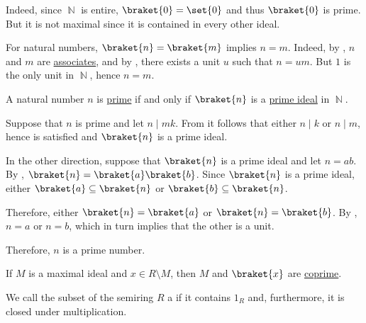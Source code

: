 \begin{example}
\begin{thmenum}
    Indeed, since \( \BbbN \) is entire, \( \braket{ 0 } = \set{ 0 } \) and thus \( \braket{ 0 } \) is prime. But it is not maximal since it is contained in every other ideal.

     For natural numbers, \( \braket{ n } = \braket{ m } \) implies \( n = m \). Indeed, by , \( n \) and \( m \) are \hyperref[def:divisibility/associates]{associates}, and by , there exists a unit \( u \) such that \( n = um \). But \( 1 \) is the only unit in \( \BbbN \), hence \( n = m \).

     A natural number \( n \) is \hyperref[def:prime_number]{prime} if and only if \( \braket{n} \) is a \hyperref[def:semiring_ideal/prime]{prime ideal} in \( \BbbN \).

    Suppose that \( n \) is prime and let \( n \mid mk \). From  it follows that either \( n \mid k \) or \( n \mid m \), hence  is satisfied and \( \braket{ n } \) is a prime ideal.

    In the other direction, suppose that \( \braket{ n } \) is a prime ideal and let \( n = ab \). By , \( \braket{ n } = \braket{ a } \braket{ b } \). Since \( \braket{ n } \) is a prime ideal, either \( \braket{ a } \subseteq \braket{ n } \) or \( \braket{ b } \subseteq \braket{ n } \).

    Therefore, either \( \braket{ n } = \braket{ a } \) or \( \braket{ n } = \braket{ b } \). By , \( n = a \) or \( n = b \), which in turn implies that the other is a unit.

    Therefore, \( n \) is a prime number.

     If \( M \) is a maximal ideal and \( x \in R \setminus M \), then \( M \) and \( \braket{ x } \) are \hyperref[def:semiring_ideal/coprime]{coprime}.
  \end{thmenum}
\end{example}

\begin{definition}\label{def:multiplicative_set_in_semiring}
  We call the subset of the semiring \( R \) a  if it contains \( 1_R \) and, furthermore, it is closed under multiplication.
\end{definition}

